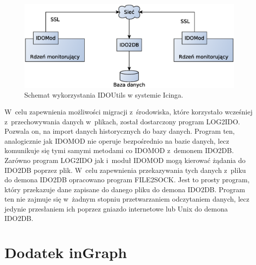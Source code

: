 \begin{figure}[ht]
  \caption{Schemat wykorzystania IDOUtils w systemie Icinga.}
  \label{fig:IDOUtils}
\includegraphics[width=1\textwidth]{img/idoutils}
\end{figure}

W~celu zapewnienia możliwości migracji z~środowiska, które korzystało
wcześniej z~przechowywania danych w~plikach, został dostarczony
program LOG2IDO. Pozwala on, na import danych historycznych do bazy
danych. Program ten, analogicznie jak IDOMOD nie operuje bezpośrednio
na bazie danych, lecz komunikuje się tymi samymi metodami co IDOMOD
z~demonem IDO2DB. Zarówno program LOG2IDO jak i~moduł IDOMOD mogą
kierować żądania do IDO2DB poprzez plik. W~celu zapewnienia
przekazywania tych danych z~pliku do demona IDO2DB opracowano program
FILE2SOCK. Jest to prosty program, który przekazuje dane zapisane do
danego pliku do demona IDO2DB. Program ten nie zajmuje się w~żadnym
stopniu przetwarzaniem odczytaniem danych, lecz jedynie przesłaniem ich
poprzez gniazdo internetowe lub Unix do demona IDO2DB.

\section[Dodatek inGraph][Dodatek inGraph]{Dodatek inGraph}
\label{sec:inGraph}

